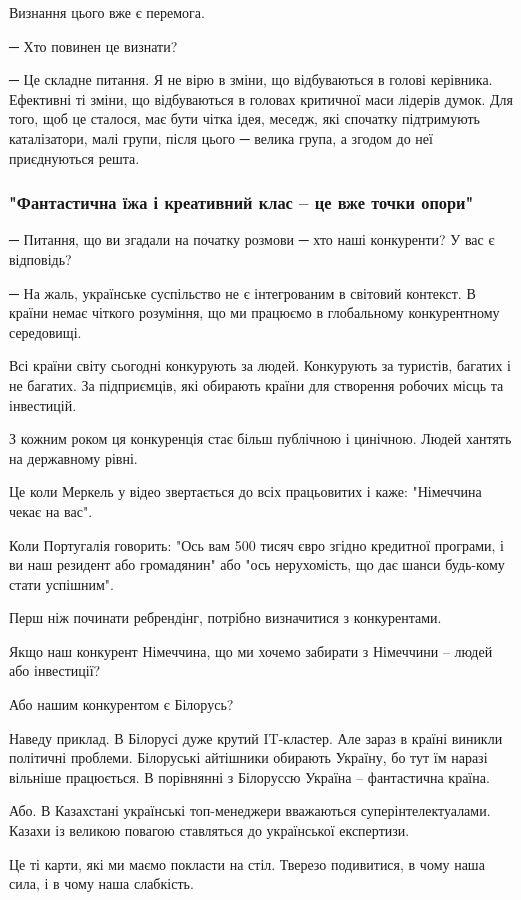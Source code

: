 Визнання цього вже є перемога.

─ Хто повинен це визнати?

─ Це складне питання. Я не вірю в зміни, що відбуваються в голові керівника.
Ефективні ті зміни, що відбуваються в головах критичної маси лідерів думок. Для
того, щоб це сталося, має бути чітка ідея, меседж, які спочатку підтримують
каталізатори, малі групи, після цього ─ велика група, а згодом до неї
приєднуються решта. 

\subsubsection{"Фантастична їжа і креативний клас – це вже точки опори"}

─ Питання, що ви згадали на початку розмови ─ хто наші конкуренти? У вас є
відповідь?

─ На жаль, українське суспільство не є інтегрованим в світовий контекст. В
країни немає чіткого розуміння, що ми працюємо в глобальному конкурентному
середовищі.

Всі країни світу сьогодні конкурують за людей. Конкурують за туристів, багатих
і не багатих. За підприємців, які обирають країни для створення робочих місць
та інвестицій.

З кожним роком ця конкуренція стає більш публічною і цинічною. Людей хантять на державному рівні.

Це коли Меркель у відео звертається до всіх працьовитих і каже: "Німеччина
чекає на вас". 

Коли Португалія говорить: "Ось вам 500 тисяч євро згідно кредитної програми, і
ви наш резидент або громадянин" або "ось нерухомість, що дає шанси будь-кому
стати успішним".

Перш ніж починати ребрендінг, потрібно визначитися з конкурентами.

Якщо наш конкурент Німеччина, що ми хочемо забирати з Німеччини – людей або інвестиції?

Або нашим конкурентом є Білорусь?

Наведу приклад. В Білорусі дуже крутий IT-кластер. Але зараз в країні виникли
політичні проблеми. Білоруські айтішники обирають Україну, бо тут їм наразі
вільніше працюється. В порівнянні з Білоруссю Україна – фантастична країна.

Або. В Казахстані українські топ-менеджери вважаються суперінтелектуалами.
Казахи із великою повагою ставляться до української експертизи.

Це ті карти, які ми маємо покласти на стіл. Тверезо подивитися, в чому наша
сила, і в чому наша слабкість.

